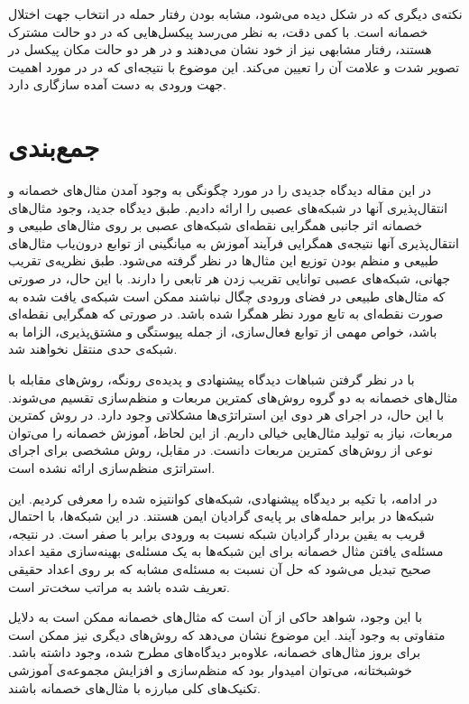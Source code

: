 \documentclass[12pt,onecolumn,a4paper]{article}
\begin{document}
نکته‌ی دیگری که در شکل دیده می‌شود، مشابه بودن رفتار حمله در انتخاب جهت اختلال خصمانه است. با کمی دقت، به نظر می‌رسد پیکسل‌هایی که در دو حالت مشترک هستند، رفتار مشابهی نیز از خود نشان می‌دهند و در هر دو حالت مکان پیکسل در تصویر  شدت و علامت آن را تعیین می‌کند. این موضوع با نتیجه‌ای که در \cite{goodfellow2014explaining} در مورد اهمیت جهت ورودی به دست آمده سازگاری دارد.

\section{جمع‌بندی}
در این مقاله دیدگاه جدیدی را در مورد چگونگی به وجود آمدن مثال‌های خصمانه و انتقال‌پذیری آنها در شبکه‌های عصبی را ارائه دادیم. طبق دیدگاه جدید، وجود مثال‌های خصمانه اثر جانبی همگرایی نقطه‌ای شبکه‌های عصبی بر روی مثال‌های طبیعی و انتقال‌پذیری آنها نتیجه‌ی همگرایی فرآیند آموزش به میانگینی از توابع درون‌یاب مثال‌های طبیعی و منظم بودن توزیع این مثال‌ها در نظر گرفته می‌شود. طبق نظریه‌ی تقریب جهانی، شبکه‌های عصبی توانایی تقریب زدن هر تابعی را دارند. با این حال، در صورتی که مثال‌های طبیعی در فضای ورودی چگال نباشند ممکن است شبکه‌ی یافت شده به صورت نقطه‌ای به تابع مورد نظر همگرا شده باشد. در صورتی که همگرایی نقطه‌ای باشد، خواص مهمی از توابع فعال‌سازی، از جمله پیوستگی و مشتق‌پذیری، الزاما به شبکه‌ی حدی منتقل نخواهند شد.

با در نظر گرفتن شباهات دیدگاه پیشنهادی و پدیده‌ی رونگه، روش‌های مقابله با مثال‌های خصمانه به دو گروه روش‌های کمترین مربعات و منظم‌سازی تقسیم می‌شوند. با این حال، در اجرای هر دوی این استراتژی‌ها مشکلاتی وجود دارد. در روش کمترین مربعات، نیاز به تولید مثال‌هایی خیالی داریم. از این لحاظ، آموزش خصمانه را می‌توان نوعی از روش‌های کمترین مربعات دانست. در مقابل، روش مشخصی برای اجرای استراتژی منظم‌سازی ارائه نشده است.

در ادامه، با تکیه بر دیدگاه پیشنهادی، شبکه‌های کوانتیزه شده را معرفی کردیم. این شبکه‌ها در برابر حمله‌های بر پایه‌ی گرادیان ایمن هستند. در این شبکه‌ها، با احتمال قریب به یقین بردار گرادیان شبکه نسبت به ورودی برابر با صفر است. در نتیجه، مسئله‌ی یافتن مثال خصمانه برای این شبکه‌ها به یک مسئله‌ی بهینه‌سازی مقید اعداد صحیح تبدیل می‌شود که حل آن نسبت به مسئله‌ی مشابه که بر روی اعداد حقیقی تعریف شده باشد به مراتب سخت‌تر است.

با این وجود، شواهد حاکی از آن است که مثال‌های خصمانه ممکن است به دلایل متفاوتی به وجود آیند. این موضوع نشان می‌دهد که روش‌های دیگری نیز ممکن است برای بروز مثال‌های خصمانه، علاوه‌بر دیدگاه‌های مطرح شده، وجود داشته باشد. خوشبختانه، می‌توان امیدوار بود که منظم‌سازی و افزایش مجموعه‌ی آموزشی تکنیک‌های کلی مبارزه با مثال‌های خصمانه باشند.

\setLTRbibitems


\end{document}
